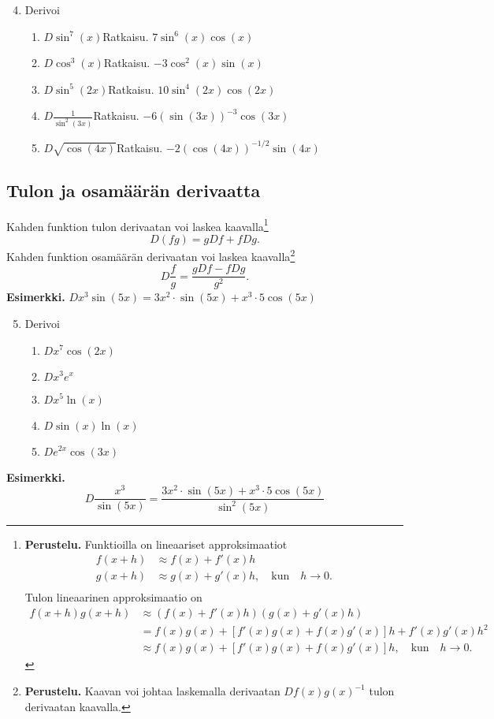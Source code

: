 \documentclass[10pt]{article}
\newcommand{\ratkaisu}[1]{\hfill{\color{blue}\quad\textrm{Ratkaisu. } #1}}
\begin{document}
\begin{enumerate}
\setcounter{enumi}{3}
\item Derivoi
\begin{enumerate}
\item $D\sin^7(x)$\ratkaisu{$7\sin^6(x)\cos(x)$}
\item $D\cos^3(x)$\ratkaisu{$-3\cos^2(x)\sin(x)$}
\item $D\sin^5(2x)$\ratkaisu{$10\sin^4(2x)\cos(2x)$}
\item $D\frac{1}{\sin^2(3x)}$\ratkaisu{$-6(\sin(3x))^{-3}\cos(3x)$}
\item $D\sqrt{\cos(4x)}$\ratkaisu{$-2(\cos(4x))^{-1/2}\sin(4x)$}
\end{enumerate}
\end{enumerate}

\newpage

\subsection{Tulon ja osamäärän derivaatta}

Kahden funktion tulon derivaatan voi laskea kaavalla\footnote{\textbf{Perustelu.} Funktioilla on lineaariset approksimaatiot
\begin{equation*}
\begin{split}
f(x+h)&\approx f(x)+f'(x)h\\
g(x+h)&\approx g(x)+g'(x)h,\quad\textrm{kun}\quad h\to 0.\\
\end{split}
\end{equation*}
Tulon lineaarinen approksimaatio on
\begin{equation*}
\begin{split}
f(x+h)g(x+h)
&\approx (f(x)+f'(x)h)(g(x)+g'(x)h)\\
&=f(x)g(x)+[f'(x)g(x)+f(x)g'(x)]h
+f'(x)g'(x)h^2\\
&\approx f(x)g(x)+[f'(x)g(x)+f(x)g'(x)]h,\quad\textrm{kun}\quad h\to 0.
\end{split}
\end{equation*}}
$$
D(fg)=gDf+fDg.
$$
Kahden funktion osamäärän derivaatan voi laskea kaavalla\footnote{\textbf{Perustelu.} Kaavan voi johtaa laskemalla derivaatan $Df(x)g(x)^{-1}$ tulon derivaatan kaavalla.}
$$
D\frac{f}{g}=\frac{gDf-fDg}{g^2}.
$$
\textbf{Esimerkki.} $Dx^3\sin(5x)=3x^2\cdot \sin(5x)+x^3\cdot 5\cos(5x)$

\begin{enumerate}
\setcounter{enumi}{4}
\item Derivoi
\begin{enumerate}
\item $Dx^7\cos(2x)$
\item $Dx^3e^{x}$
\item $Dx^5\ln(x)$
\item $D\sin(x)\ln(x)$
\item $De^{2x}\cos(3x)$
\end{enumerate}
\end{enumerate}
\textbf{Esimerkki.}
$$
D\frac{x^3}{\sin(5x)}=\frac{3x^2\cdot \sin(5x)+x^3\cdot 5\cos(5x)}{\sin^2(5x)}
$$
\end{document}
